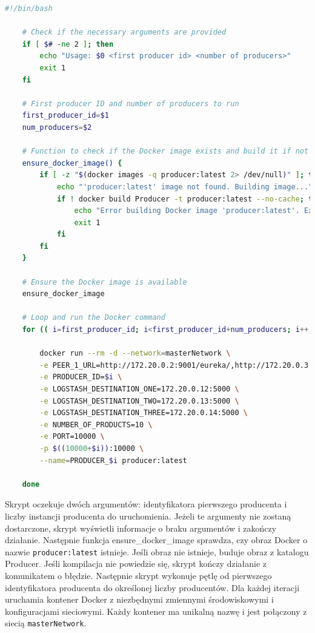 \begin{lstlisting}[language=bash,caption=Kod skryptu producers.sh,label=producerBashScript]
    #!/bin/bash

    # Check if the necessary arguments are provided
    if [ $# -ne 2 ]; then
        echo "Usage: $0 <first producer id> <number of producers>"
        exit 1
    fi
    
    # First producer ID and number of producers to run
    first_producer_id=$1
    num_producers=$2
    
    # Function to check if the Docker image exists and build it if not
    ensure_docker_image() {
        if [ -z "$(docker images -q producer:latest 2> /dev/null)" ]; then
            echo "'producer:latest' image not found. Building image..."
            if ! docker build Producer -t producer:latest --no-cache; then
                echo "Error building Docker image 'producer:latest'. Exiting."
                exit 1
            fi
        fi
    }
    
    # Ensure the Docker image is available
    ensure_docker_image
    
    # Loop and run the Docker command
    for (( i=first_producer_id; i<first_producer_id+num_producers; i++ )); do
    
        docker run --rm -d --network=masterNetwork \
        -e PEER_1_URL=http://172.20.0.2:9001/eureka/,http://172.20.0.3:9002/eureka/,http://172.20.0.4:9003/eureka/ \
        -e PRODUCER_ID=$i \
        -e LOGSTASH_DESTINATION_ONE=172.20.0.12:5000 \
        -e LOGSTASH_DESTINATION_TWO=172.20.0.13:5000 \
        -e LOGSTASH_DESTINATION_THREE=172.20.0.14:5000 \
        -e NUMBER_OF_PRODUCTS=10 \
        -e PORT=10000 \
        -p $((10000+$i)):10000 \
        --name=PRODUCER_$i producer:latest
    
    done

\end{lstlisting}

Skrypt oczekuje dwóch argumentów: identyfikatora pierwszego producenta i liczby instancji producenta do uruchomienia. Jeżeli te argumenty nie zostaną dostarczone, skrypt wyświetli informacje o braku argumentów i zakończy działanie. Następnie funkcja ensure\_docker\_image sprawdza, czy obraz Docker o nazwie \verb|producer:latest| istnieje. Jeśli obraz nie istnieje, buduje obraz z katalogu Producer. Jeśli kompilacja nie powiedzie się, skrypt kończy działanie z komunikatem o błędzie. Następnie skrypt wykonuje pętlę od pierwszego identyfikatora producenta do określonej liczby producentów. Dla każdej iteracji uruchamia kontener Docker z niezbędnymi zmiennymi środowiskowymi i konfiguracjami sieciowymi. Każdy kontener ma unikalną nazwę i jest połączony z siecią \verb|masterNetwork|.


